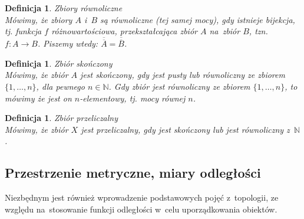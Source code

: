 \documentclass[12pt,a4paper]{report}
\newtheorem{definition}[theorem]{Definicja}
\newcommand{\licznosc}[1]{\overline{\overline{#1}}}
\begin{document}
\begin{definition}{Zbiory równoliczne \cite[Rozdział 5]{blaszczyk2007}}\\
Mówimy, że zbiory $A$ i~$B$ są równoliczne (tej samej mocy), gdy istnieje bijekcja, tj. funkcja $f$ różnowartościowa, przekształcająca zbiór $A$ na~zbiór $B$, tzn. $f: A \rightarrow B$. Piszemy wtedy:  $\licznosc{A}=\licznosc{B}$.
\end{definition}


\begin{definition}{Zbiór skończony \cite[Rozdział 5]{blaszczyk2007}}\\
Mówimy, że zbiór $A$ jest skończony, gdy jest pusty lub równoliczny ze zbiorem $\{1, \ldots, n \}$, dla pewnego $n \in \mathbb{N}$. Gdy zbiór jest równoliczny ze zbiorem $\{1, \ldots, n\}$, to mówimy że jest on $n$-elementowy, tj. mocy równej $n$.
\end{definition}


\begin{definition}{Zbiór przeliczalny \cite[Rozdział 5]{blaszczyk2007}}\\
Mówimy, że zbiór $X$ jest przeliczalny, gdy jest skończony lub jest równoliczny z~$\mathbb{N}$.
\end{definition}






\subsection{Przestrzenie metryczne, miary odległości}


Niezbędnym jest również wprowadzenie podstawowych pojęć z~topologii, ze względu na~stosowanie funkcji odległości w~celu uporządkowania obiektów.
\end{document}
